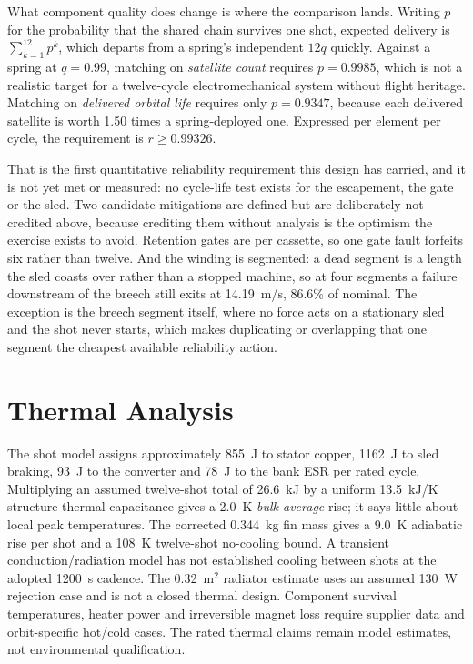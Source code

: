 \documentclass[conference]{IEEEtran}
\begin{document}
What component quality does change is where the comparison lands. Writing $p$ for the probability that the shared chain survives one shot, expected delivery is $\sum_{k=1}^{12}p^k$, which departs from a spring's independent $12q$ quickly. Against a spring at $q=0.99$, matching on \emph{satellite count} requires $p=0.9985$, which is not a realistic target for a twelve-cycle electromechanical system without flight heritage. Matching on \emph{delivered orbital life} requires only $p=0.9347$, because each delivered satellite is worth 1.50 times a spring-deployed one. Expressed per element per cycle, the requirement is $r\geq0.99326$.

That is the first quantitative reliability requirement this design has carried, and it is not yet met or measured: no cycle-life test exists for the escapement, the gate or the sled. Two candidate mitigations are defined but are deliberately not credited above, because crediting them without analysis is the optimism the exercise exists to avoid. Retention gates are per cassette, so one gate fault forfeits six rather than twelve. And the winding is segmented: a dead segment is a length the sled coasts over rather than a stopped machine, so at four segments a failure downstream of the breech still exits at 14.19~m/s, 86.6\% of nominal. The exception is the breech segment itself, where no force acts on a stationary sled and the shot never starts, which makes duplicating or overlapping that one segment the cheapest available reliability action.

\section{Thermal Analysis}\label{sec:thermal}
The shot model assigns approximately 855~J to stator copper, 1162~J to sled braking, 93~J to the converter and 78~J to the bank ESR per rated cycle. Multiplying an assumed twelve-shot total of 26.6~kJ by a uniform 13.5~kJ/K structure thermal capacitance gives a 2.0~K \emph{bulk-average} rise; it says little about local peak temperatures. The corrected 0.344~kg fin mass gives a 9.0~K adiabatic rise per shot and a 108~K twelve-shot no-cooling bound. A transient conduction/radiation model has not established cooling between shots at the adopted 1200~s cadence. The 0.32~m$^2$ radiator estimate uses an assumed 130~W rejection case and is not a closed thermal design. Component survival temperatures, heater power and irreversible magnet loss require supplier data and orbit-specific hot/cold cases. The rated thermal claims remain model estimates, not environmental qualification.
\end{document}

